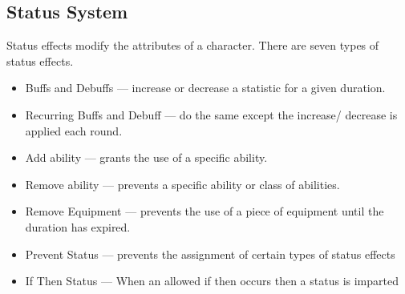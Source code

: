 \subsection{Status System}
Status effects modify the attributes of a character. There are seven types of status effects. 
\begin{itemize}
\item Buffs and Debuffs --- increase or decrease a statistic for a given duration. 
\item Recurring Buffs and Debuff --- do the same except the increase/ decrease is applied each round.
\item Add ability --- grants the use of a specific ability.
\item Remove ability --- prevents a specific ability or class of abilities.
\item Remove Equipment --- prevents the use of a piece of equipment until the duration has expired.
\item Prevent Status --- prevents the assignment of certain types of status effects
\item If Then Status --- When an allowed if then occurs then a status is imparted
\end{itemize}
